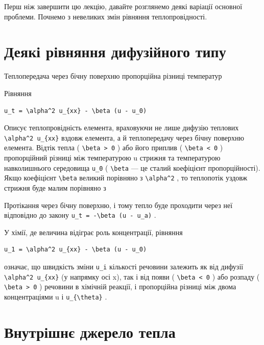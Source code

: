 \documentclass[
  ukrainian,
]{article}
\begin{document}
Перш ніж завершити цю лекцію, давайте розглянемо деякі варіації основної
проблеми. Почнемо з невеликих змін рівняння теплопровідності.

\section{Деякі рівняння дифузійного
типу}\label{ux434ux435ux44fux43aux456-ux440ux456ux432ux43dux44fux43dux43dux44f-ux434ux438ux444ux443ux437ux456ux439ux43dux43eux433ux43e-ux442ux438ux43fux443}

Теплопередача через бічну поверхню пропорційна різниці температур

Рівняння

\begin{verbatim}
u_t = \alpha^2 u_{xx} - \beta (u - u_0)
\end{verbatim}

Описує теплопровідність елемента, враховуючи не лише дифузію теплових
\texttt{\textbackslash{}alpha\^{}2\ u\_\{xx\}} вздовж елемента, а й
теплопередачу через бічну поверхню елемента. Відтік тепла (
\texttt{\textbackslash{}beta\ \textgreater{}\ 0} ) або його приплив (
\texttt{\textbackslash{}beta\ \textless{}\ 0} ) пропорційний різниці між
температурою u стрижня та температурою навколишнього середовища
\texttt{u\_0} ( \texttt{\textbackslash{}beta} --- це сталий коефіцієнт
пропорційності). Якщо коефіцієнт \texttt{\textbackslash{}beta} великий
порівняно з \texttt{\textbackslash{}alpha\^{}2} , то теплопотік уздовж
стрижня буде малим порівняно з

Протікання через бічну поверхню, і тому тепло буде проходити через неї
відповідно до закону
\texttt{u\_t\ =\ -\textbackslash{}beta\ (u\ -\ u\_a)} .

У хімії, де величина відіграє роль концентрації, рівняння

\begin{verbatim}
u_1 = \alpha^2 u_{xx} - \beta (u - u_0)
\end{verbatim}

означає, що швидкість зміни \texttt{u\_i} кількості речовини залежить як
від дифузії \texttt{\textbackslash{}alpha\^{}2\ u\_\{xx\}} (у напрямку
осі x), так і від появи ( \texttt{\textbackslash{}beta\ \textless{}\ 0}
) або розпаду ( \texttt{\textbackslash{}beta\ \textgreater{}\ 0} )
речовини в хімічній реакції, і пропорційна різниці між двома
концентраціями u і \texttt{u\_\{\textbackslash{}theta\}} .

\section{Внутрішнє джерело
тепла}\label{ux432ux43dux443ux442ux440ux456ux448ux43dux454-ux434ux436ux435ux440ux435ux43bux43e-ux442ux435ux43fux43bux430}
\end{document}

